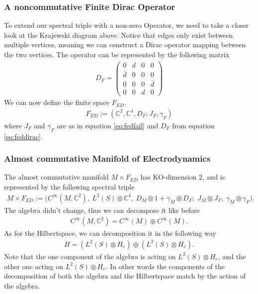 \subsubsection{A noncommutative Finite Dirac Operator}
To extend our spectral triple with a non-zero Operator, we need to take a
closer look at the Krajewski diagram above. Notice that edges only exist
between multiple vertices, meaning we can construct a Dirac operator mapping
between the two vertices. The operator can be represented by the following matrix
\begin{align}\label{eq:feddirac}
    D_F =
    \begin{pmatrix}
    0 & d & 0 & 0 \\
    \bar{d} & 0 & 0 & 0 \\
    0 & 0 & 0 & \bar{d} \\
    0 & 0 & d & 0
    \end{pmatrix}
\end{align}
We can now define the finite space $F_{ED}$.
\begin{align}
    F_{ED} := (\mathbb{C}^2, \mathbb{C}^4, D_F; J_F, \gamma_F)
\end{align}
where $J_F$ and $\gamma_F$ are as in equation \eqref{eq:fedfail} and $D_F$
from equation \eqref{eq:feddirac}.

\subsubsection{Almost commutative Manifold of Electrodynamics}
The almost commutative manifold $M\times F_{ED}$ has KO-dimension 2, and is
represented by the following spectral triple
\begin{align}\label{eq:almost commutative manifold}
    M\times F_{ED} := \big(C^\infty(M,\mathbb{C}^2),\ L^2(S)\otimes
    \mathbb{C}^4,\
    D_M\otimes 1 +\gamma _M \otimes D_F;\; J_M\otimes J_F,\ \gamma_M\otimes
    \gamma _F\big).
\end{align}
The algebra didn't change, thus we can decompose it like before
\begin{align}
    C^\infty(M, \mathbb{C}^2) = C^\infty (M) \oplus C^\infty (M).
\end{align}
As for the Hilbertspace, we can decomposition it in the following way
\begin{align}
    H = (L^2(S) \otimes H_e ) \oplus (L^2(S) \otimes H_{\bar{e}}).
\end{align}
Note that the one component of the algebra is acting on $L^2(S) \otimes H_e$,
and the other one acting on $L^2(S) \otimes H_{\bar{e}}$. In other words the components of
the decomposition of both the algebra and the Hilbertspace match by the action of
the algebra.

